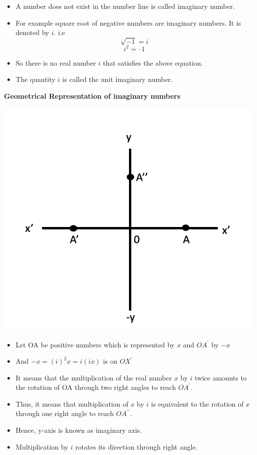 \documentclass[]{book}
\providecommand{\tightlist}{%
  \setlength{\itemsep}{0pt}\setlength{\parskip}{0pt}}
\begin{document}
\begin{itemize}
\tightlist
\item
  A number does not exist in the number line is called imaginary number.
\item
  For example square root of negative numbers are imaginary numbers. It is denoted by \(i\).
  i.e \[\sqrt{-1}=i\] \newline
  \[i^{2} = – 1\]
\item
  So there is no real number \(i\) that satisfies the above equation.
\item
  The quantity \(i\) is called the unit imaginary number.
\end{itemize}

\textbf{Geometrical Representation of imaginary numbers}

\begin{center}\includegraphics[width=0.5\linewidth]{figure/1-ImgNum} \end{center}

\begin{itemize}
\tightlist
\item
  Let OA be positive numbers which is represented by \(x\) and \(OA^\prime\) by \(-x\)
\item
  And \(-x= (i)^2x=i(ix)\) is on \(OX^{\prime}\)
\item
  It means that the multiplication of the real number \(x\) by \(i\) twice amounts to the rotation of OA through two right angles to reach \(OA^\prime\).
\item
  Thus, it means that multiplication of \(x\) by \(i\) is equivalent to the rotation of \(x\) through one right angle to reach \(OA^{\prime\prime}\).
\item
  Hence, y-axis is known as imaginary axis.
\item
  Multiplication by \(i\) rotates its direction through right angle.
\end{itemize}
\end{document}
